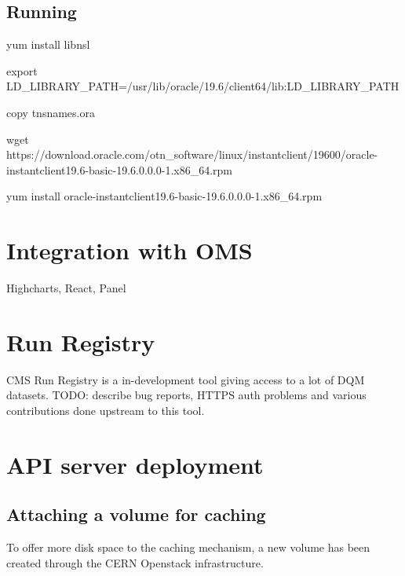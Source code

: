 \subsection{Running}
\begin{textcode}
yum install libnsl

export LD_LIBRARY_PATH=/usr/lib/oracle/19.6/client64/lib:LD_LIBRARY_PATH

copy tnsnames.ora

wget https://download.oracle.com/otn_software/linux/instantclient/19600/oracle-instantclient19.6-basic-19.6.0.0.0-1.x86_64.rpm

yum install oracle-instantclient19.6-basic-19.6.0.0.0-1.x86_64.rpm
\end{textcode}

\section{Integration with OMS}

Highcharts, React, Panel

\section{Run Registry}

CMS Run Registry \cite{cms_collaboration_2019_3599323} is a in-development tool giving access to a lot of DQM datasets. TODO: describe bug reports, HTTPS auth problems and various contributions done upstream to this tool.

\cite{FixingtheBreakagefromtheAddTrustExternalCARootExpiration-2020-10-03} \cite{ErrorSSLCERTIFICATEVERIFYFAILEDIssue1CMSTrackerDPGcernrequests-2020-10-03} \cite{SSLerrorraisedbytheclientIssue1fabioespinosarunregistryapiclient-2020-10-03} \cite{WorkaroundskipSSLverificationbyavivacePullRequest2fabioespinosarunregistryapiclient-2020-10-03}

\section{API server deployment}

\subsection{Attaching a volume for caching}

To offer more disk space to the caching mechanism, a new volume has been created through the CERN Openstack infrastructure.

